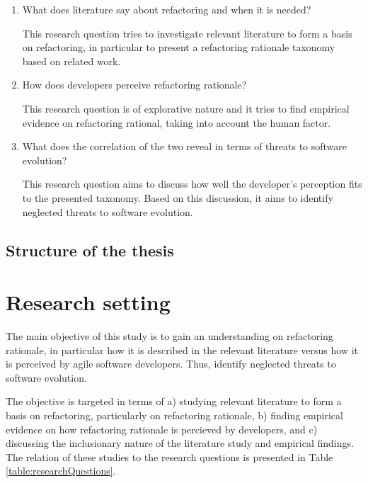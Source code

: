 \documentclass[english,12pt,a4paper,pdftex,sci,utf8]{aaltothesis}
\begin{document}
\begin{enumerate}[label=\textbf{RQ\arabic*}]
\item What does literature say about refactoring and when it is needed?

This research question tries to investigate relevant literature to form a basis on refactoring, in particular to present a refactoring rationale taxonomy based on related work.
\item How does developers perceive refactoring rationale?

This research question is of explorative nature and it tries to find empirical evidence on refactoring rational, taking into account the human factor. 
\item What does the correlation of the two reveal in terms of threats to software evolution?

This research question aims to discuss how well the developer's perception fits to the presented taxonomy. Based on this discussion, it aims to identify neglected threats to software evolution.
\end{enumerate}

\subsection{Structure of the thesis} \label{structure}
\clearpage

\section{Research setting} \label{research setting}

The main objective of this study is to gain an understanding on refactoring rationale, in particular how it is described in the relevant literature versus how it is perceived by agile software developers. Thus, identify neglected threats to software evolution. 

The objective is targeted in terms of a) studying relevant literature to form a basis on refactoring, particularly on refactoring rationale, b) finding empirical evidence on how refactoring rationale is percieved by developers, and c) discussing the inclusionary nature of the literature study and empirical findings. The relation of these studies to the research questions is presented in Table \ref{table:researchQuestions}.
\end{document}
